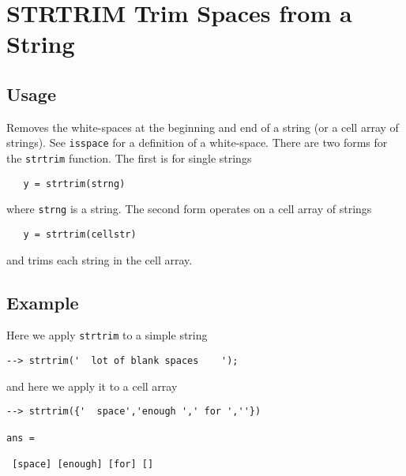 \section{STRTRIM Trim Spaces from a String}

\subsection{Usage}

Removes the white-spaces at the beginning and end of a string (or a 
cell array of strings). See \verb|isspace| for a definition of a white-space.
There are two forms for the \verb|strtrim| function.  The first is for
single strings
\begin{verbatim}
   y = strtrim(strng)
\end{verbatim}
where \verb|strng| is a string.  The second form operates on a cell array
of strings
\begin{verbatim}
   y = strtrim(cellstr)
\end{verbatim}
and trims each string in the cell array.
\subsection{Example}

Here we apply \verb|strtrim| to a simple string
\begin{verbatim}
--> strtrim('  lot of blank spaces    ');
\end{verbatim}
and here we apply it to a cell array
\begin{verbatim}
--> strtrim({'  space','enough ',' for ',''})

ans = 

 [space] [enough] [for] [] 
\end{verbatim}
